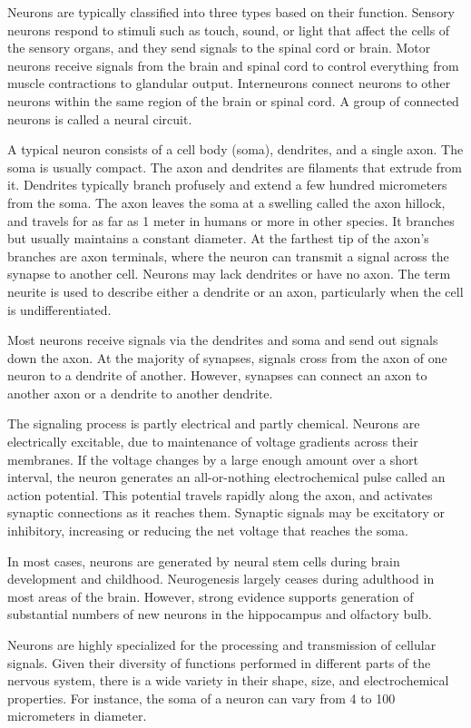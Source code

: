\documentclass[]{book}
\begin{document}
Neurons are typically classified into three types based on their function. Sensory neurons respond to stimuli such as touch, sound, or light that affect the cells of the sensory organs, and they send signals to the spinal cord or brain. Motor neurons receive signals from the brain and spinal cord to control everything from muscle contractions to glandular output. Interneurons connect neurons to other neurons within the same region of the brain or spinal cord. A group of connected neurons is called a neural circuit.

A typical neuron consists of a cell body (soma), dendrites, and a single axon. The soma is usually compact. The axon and dendrites are filaments that extrude from it. Dendrites typically branch profusely and extend a few hundred micrometers from the soma. The axon leaves the soma at a swelling called the axon hillock, and travels for as far as 1 meter in humans or more in other species. It branches but usually maintains a constant diameter. At the farthest tip of the axon's branches are axon terminals, where the neuron can transmit a signal across the synapse to another cell. Neurons may lack dendrites or have no axon. The term neurite is used to describe either a dendrite or an axon, particularly when the cell is undifferentiated.

Most neurons receive signals via the dendrites and soma and send out signals down the axon. At the majority of synapses, signals cross from the axon of one neuron to a dendrite of another. However, synapses can connect an axon to another axon or a dendrite to another dendrite.

The signaling process is partly electrical and partly chemical. Neurons are electrically excitable, due to maintenance of voltage gradients across their membranes. If the voltage changes by a large enough amount over a short interval, the neuron generates an all-or-nothing electrochemical pulse called an action potential. This potential travels rapidly along the axon, and activates synaptic connections as it reaches them. Synaptic signals may be excitatory or inhibitory, increasing or reducing the net voltage that reaches the soma.

In most cases, neurons are generated by neural stem cells during brain development and childhood. Neurogenesis largely ceases during adulthood in most areas of the brain. However, strong evidence supports generation of substantial numbers of new neurons in the hippocampus and olfactory bulb.

Neurons are highly specialized for the processing and transmission of cellular signals. Given their diversity of functions performed in different parts of the nervous system, there is a wide variety in their shape, size, and electrochemical properties. For instance, the soma of a neuron can vary from 4 to 100 micrometers in diameter.
\end{document}
